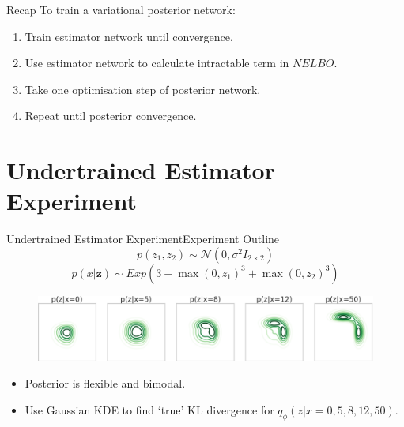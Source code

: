 \documentclass[handout]{beamer}
\begin{document}
\begin{frame}{Recap}
To train a variational posterior network:
\begin{enumerate}
\item Train estimator network until convergence.
\vspace{0.3cm}
\item Use estimator network to calculate intractable term in $NELBO$.
\vspace{0.3cm}
\item Take one optimisation step of posterior network.
\vspace{0.3cm}
\item Repeat until posterior convergence.
\end{enumerate}
\end{frame}
\section{Undertrained Estimator Experiment}
\begin{frame}{Undertrained Estimator Experiment}{Experiment Outline}
\[p(z_1,z_2)\sim \mathcal{N} (0,\sigma^2 I_{2\times 2})\]
\[p(x|\bm{z})\sim Exp(3+\max(0,z_1)^3+\max(0,z_2)^3)\]
\begin{figure}[h]
\includegraphics[width=\textwidth]{sprinklertrue.png}
\end{figure}
\begin{itemize}
\item Posterior is flexible and bimodal.
\item Use Gaussian KDE to find `true' KL divergence for $q_\phi(z|x=0,5,8,12,50)$.
\end{itemize}
\end{frame}
\end{document}
